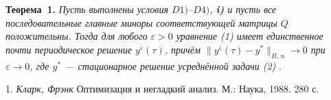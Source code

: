 \textbf{Теорема~1.} {\it Пусть выполнены условия  $D1)$--$D4)$, \textbf{i)} и пусть все последовательные главные миноры соответствующей матрицы $Q$ положительны. Тогда для любого $\varepsilon >0$ уравнение (1) имеет единственное почти периодическое решение $y^\varepsilon(\tau)$, причём ${\|y^\varepsilon(\tau)-y^*\|_{B,\, n}\rightarrow 0}$ при $\varepsilon\rightarrow 0$, где $y^*$ --- стационарное решение усреднённой задачи (2)} .


\litlist

1. {\it Кларк, Фрэнк} Оптимизация и негладкий анализ. М.: Наука, 1988. 280 с.

